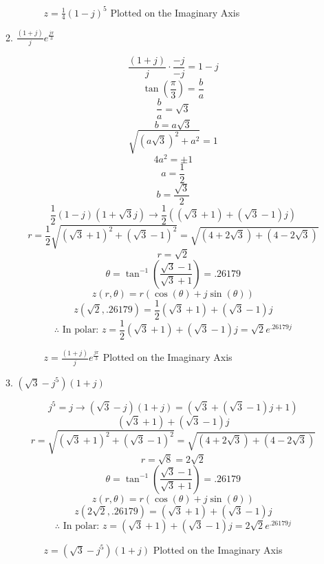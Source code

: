 \begin{enumerate}
\begin{enumerate}
        \begin{figure}[H]
          \centering
          
          \caption{$z=\frac{1}{4}(1-j)^5$ Plotted on the Imaginary Axis}
          \label{fig:4}
        \end{figure}

      \item $\frac{(1+j)}{j}e^{\frac{j\pi}{3}}$

        $$\frac{(1+j)}{j}\cdot\frac{-j}{-j}=1-j$$
        $$\tan\left( \frac{\pi}{3} \right)=\frac{b}{a}$$
        $$\frac{b}{a}=\sqrt{3}$$
        $$b=a\sqrt{3}$$
        $$\sqrt{(a\sqrt{3})^2+a^2}=1$$
        $$4a^2=\pm1$$
        $$a=\frac{1}{2}$$
        $$b=\frac{\sqrt{3}}{2}$$
        $$\frac{1}{2}(1-j)(1+\sqrt{3}j)\to\frac{1}{2}((\sqrt{3}+1)+(\sqrt{3}-1)j)$$
        $$r=\frac{1}{2}\sqrt{(\sqrt{3}+1)^2+(\sqrt{3}-1)^2}=\sqrt{(4+2\sqrt{3})+(4-2\sqrt{3})}$$
        $$r=\sqrt{2}$$
        $$\theta=\tan^{-1}\left( \frac{\sqrt{3}-1}{\sqrt{3}+1} \right)=.26179$$
        $$z(r,\theta)=r(\cos(\theta)+j\sin(\theta))$$
        $$z(\sqrt{2},.26179)=\frac{1}{2}(\sqrt{3}+1)+(\sqrt{3}-1)j$$
        $$\therefore \text{ In polar: } \boxed{z=\frac{1}{2}(\sqrt{3}+1)+(\sqrt{3}-1)j=\sqrt{2}e^{.26179j}}$$

        \begin{figure}[H]
          \centering
          
          \caption{$z=\frac{(1+j)}{j}e^{\frac{j\pi}{3}}$ Plotted on the Imaginary Axis}
          \label{fig:5}
        \end{figure}

      \item $(\sqrt{3}-j^5)(1+j)$

        $$j^5=j\to (\sqrt{3}-j)(1+j)=(\sqrt{3}+(\sqrt{3}-1)j+1)$$
        $$(\sqrt{3}+1)+(\sqrt{3}-1)j$$
        $$r=\sqrt{(\sqrt{3}+1)^2+(\sqrt{3}-1)^2}=\sqrt{(4+2\sqrt{3})+(4-2\sqrt{3})}$$
        $$r=\sqrt{8}=2\sqrt{2}$$
        $$\theta=\tan^{-1}\left( \frac{\sqrt{3}-1}{\sqrt{3}+1} \right)=.26179$$
        $$z(r,\theta)=r(\cos(\theta)+j\sin(\theta))$$
        $$z(2\sqrt{2},.26179)=(\sqrt{3}+1)+(\sqrt{3}-1)j$$
        $$\therefore \text{ In polar: } \boxed{z=(\sqrt{3}+1)+(\sqrt{3}-1)j=2\sqrt{2}e^{.26179j}}$$

        \begin{figure}[H]
          \centering
          
          \caption{$z=(\sqrt{3}-j^5)(1+j)$ Plotted on the Imaginary Axis}
          \label{fig:6}
        \end{figure}


\end{enumerate}
\end{enumerate}
